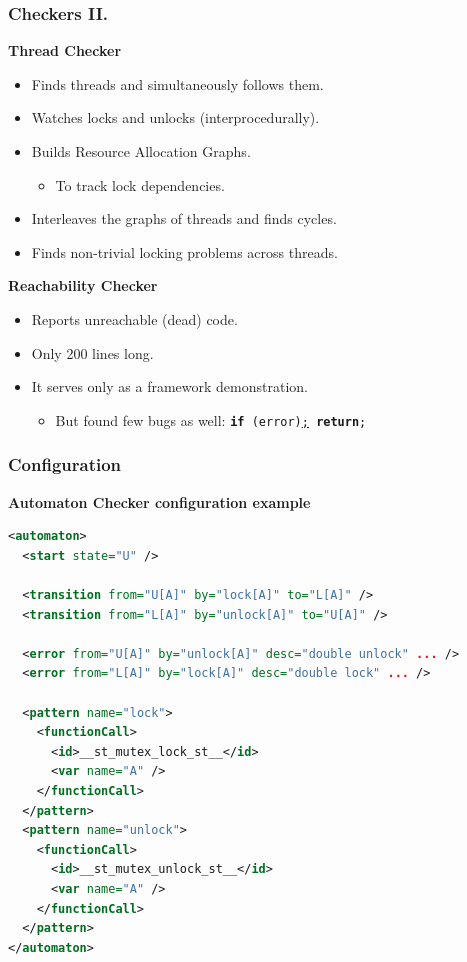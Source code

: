 \documentclass[xcolor=dvipsnames]{beamer}
\newcommand{\heading}[1]{\textbf{\textcolor{BurntOrange}{#1}}}
\begin{document}
\begin{frame}
  \frametitle{Checkers II.}
  \heading{Thread Checker}
  \begin{itemize}
  \item Finds threads and simultaneously follows them.
  \item Watches locks and unlocks (interprocedurally).
  \item Builds Resource Allocation Graphs.
    \begin{itemize}
    \item To track lock dependencies.
    \end{itemize}
  \item Interleaves the graphs of threads and finds cycles.
  \item Finds non-trivial locking problems across threads.
  \end{itemize}

  \pause
  \bigskip
  \heading{Reachability Checker}
  \begin{itemize}
  \item Reports unreachable (dead) code.
  \item Only 200 lines long.
  \item It serves only as a framework demonstration.
    \begin{itemize}
    \item But found few bugs as well: \texttt{\textbf{if} (error)\underline{;}
      \textbf{return};}
    \end{itemize}
  \end{itemize}

\end{frame}

\begin{frame}[fragile]
  \frametitle{Configuration}
  \heading{Automaton Checker configuration example}
  \begin{lstlisting}[language=XML]
<automaton>
  <start state="U" />

  <transition from="U[A]" by="lock[A]" to="L[A]" />
  <transition from="L[A]" by="unlock[A]" to="U[A]" />

  <error from="U[A]" by="unlock[A]" desc="double unlock" ... />
  <error from="L[A]" by="lock[A]" desc="double lock" ... />

  <pattern name="lock">
    <functionCall>
      <id>__st_mutex_lock_st__</id>
      <var name="A" />
    </functionCall>
  </pattern>
  <pattern name="unlock">
    <functionCall>
      <id>__st_mutex_unlock_st__</id>
      <var name="A" />
    </functionCall>
  </pattern>
</automaton>
  \end{lstlisting}
\end{frame}
\end{document}
